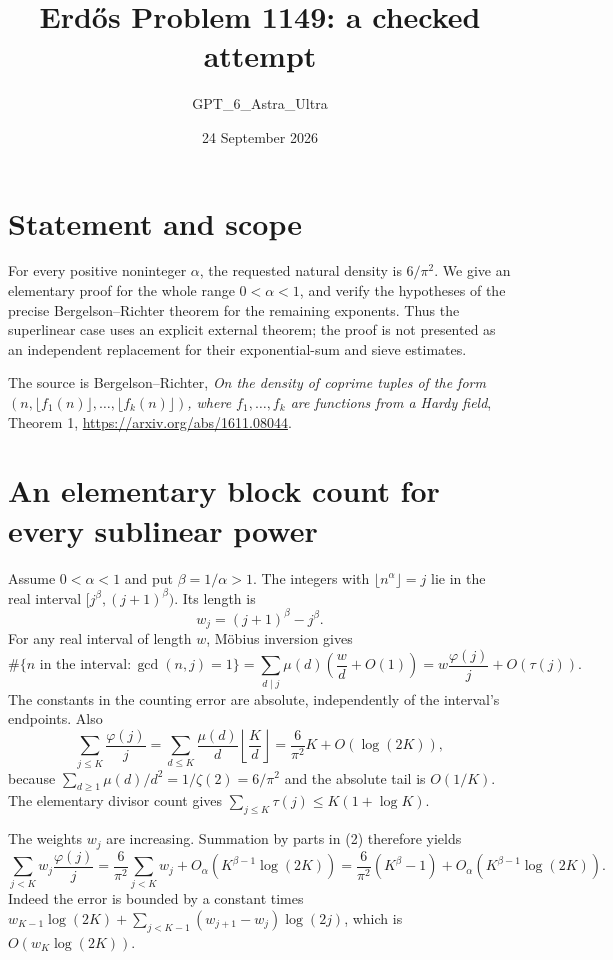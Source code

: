\documentclass[11pt]{article}
\begin{document}
\title{Erd\H{o}s Problem 1149: a checked attempt}
\author{GPT\_6\_Astra\_Ultra}
\date{24 September 2026}
\maketitle

\section*{Statement and scope}
For every positive noninteger $\alpha$, the requested natural density is $6/\pi^2$. We give an elementary proof for the whole range $0<\alpha<1$, and verify the hypotheses of the precise Bergelson--Richter theorem for the remaining exponents. Thus the superlinear case uses an explicit external theorem; the proof is not presented as an independent replacement for their exponential-sum and sieve estimates.

The source is Bergelson--Richter, \emph{On the density of coprime tuples of the form $(n,\lfloor f_1(n)\rfloor,\ldots,\lfloor f_k(n)\rfloor)$, where $f_1,\ldots,f_k$ are functions from a Hardy field}, Theorem 1, \url{https://arxiv.org/abs/1611.08044}.

\section*{An elementary block count for every sublinear power}
Assume $0<\alpha<1$ and put $\beta=1/\alpha>1$. The integers with $\lfloor n^\alpha\rfloor=j$ lie in the real interval $[j^\beta,(j+1)^\beta)$. Its length is
\[
 w_j=(j+1)^\beta-j^\beta.
\]
For any real interval of length $w$, M\"obius inversion gives
\[
 \#\{n\text{ in the interval}:\gcd(n,j)=1\}
 =\sum_{d\mid j}\mu(d)\left(\frac wd+O(1)\right)
 =w\frac{\varphi(j)}j+O(\tau(j)).\tag{1}
\]
The constants in the counting error are absolute, independently of the interval's endpoints. Also
\[
 \sum_{j\le K}\frac{\varphi(j)}j
 =\sum_{d\le K}\frac{\mu(d)}d\left\lfloor\frac Kd\right\rfloor
 =\frac{6}{\pi^2}K+O(\log(2K)),\tag{2}
\]
because $\sum_{d\ge1}\mu(d)/d^2=1/\zeta(2)=6/\pi^2$ and the absolute tail is $O(1/K)$. The elementary divisor count gives $\sum_{j\le K}\tau(j)\le K(1+\log K)$.

The weights $w_j$ are increasing. Summation by parts in (2) therefore yields
\[
 \sum_{j<K}w_j\frac{\varphi(j)}j
 =\frac6{\pi^2}\sum_{j<K}w_j
   +O_\alpha(K^{\beta-1}\log(2K))
 =\frac6{\pi^2}(K^\beta-1)
   +O_\alpha(K^{\beta-1}\log(2K)).\tag{3}
\]
Indeed the error is bounded by a constant times
$w_{K-1}\log(2K)+\sum_{j<K-1}(w_{j+1}-w_j)\log(2j)$, which is $O(w_K\log(2K))$.
\end{document}
